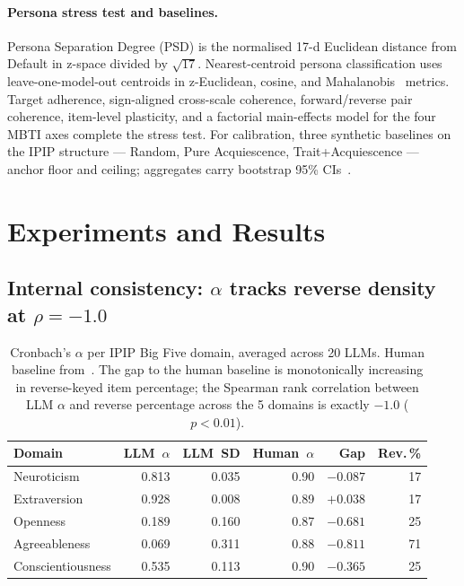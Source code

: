 \documentclass[11pt]{article}
\begin{document}
\paragraph{Persona stress test and baselines.} Persona Separation Degree (PSD) is the normalised 17-d Euclidean distance from Default in z-space divided by $\sqrt{17}$. Nearest-centroid persona classification uses leave-one-model-out centroids in z-Euclidean, cosine, and Mahalanobis~\citep{mahalanobis1936generalised} metrics. Target adherence, sign-aligned cross-scale coherence, forward/reverse pair coherence, item-level plasticity, and a factorial main-effects model for the four MBTI axes complete the stress test. For calibration, three synthetic baselines on the IPIP structure --- Random, Pure Acquiescence, Trait+Acquiescence --- anchor floor and ceiling; aggregates carry bootstrap 95\% CIs~\citep{efron1979bootstrap}.


\section{Experiments and Results}
\label{sec:results}

\subsection{Internal consistency: $\alpha$ tracks reverse density at $\rho = -1.0$}
\label{sec:results-alpha}

\begin{table}[t]
\centering
\small
\begin{tabular}{lrrrrr}
\toprule
Domain & LLM~$\alpha$ & LLM~SD & Human~$\alpha$ & Gap & Rev.\,\% \\
\midrule
Neuroticism       & 0.813 & 0.035 & 0.90 & $-0.087$ & 17 \\
Extraversion      & 0.928 & 0.008 & 0.89 & $+0.038$ & 17 \\
Openness          & 0.189 & 0.160 & 0.87 & $-0.681$ & 25 \\
Agreeableness     & 0.069 & 0.311 & 0.88 & $-0.811$ & 71 \\
Conscientiousness & 0.535 & 0.113 & 0.90 & $-0.365$ & 25 \\
\bottomrule
\end{tabular}
\caption{Cronbach's $\alpha$ per IPIP Big Five domain, averaged across 20 LLMs. Human baseline from~\citet{johnson2014measuring}. The gap to the human baseline is monotonically increasing in reverse-keyed item percentage; the Spearman rank correlation between LLM $\alpha$ and reverse percentage across the 5 domains is exactly $-1.0$ ($p < 0.01$).}
\label{tab:alpha}
\end{table}
\end{document}
